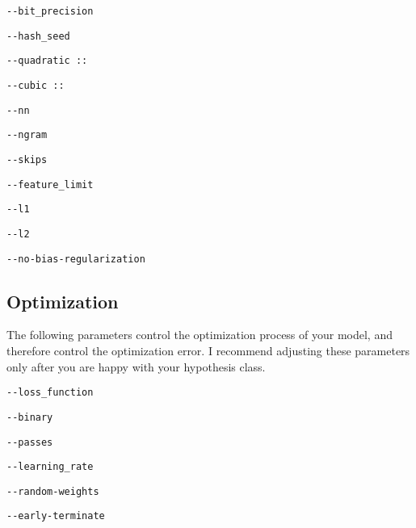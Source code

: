 \documentclass[10pt]{exam}
\theoremstyle{definition}
\begin{document}
    \vspace{1in}
    \lstinline{--bit_precision}

    \vspace{2in}
    \lstinline{--hash_seed}

    \vspace{2in}
    \lstinline{--quadratic ::}

    \vspace{2in}
    \lstinline{--cubic ::}
    
    \vspace{2in}
    \lstinline{--nn}
    
    \vspace{2in}
    \lstinline{--ngram}
    
    \vspace{2in}
    \lstinline{--skips}
    
    \vspace{2in}
    \lstinline{--feature_limit}
    
    \vspace{2in}
    \lstinline{--l1}
    
    \vspace{2in}
    \lstinline{--l2}
    
    \vspace{2in}
    \lstinline{--no-bias-regularization}
    \vspace{1in}

    \newpage
\subsection{Optimization}
    The following parameters control the optimization process of your model,
    and therefore control the optimization error.
    I recommend adjusting these parameters only after you are happy with your hypothesis class.

    \vspace{0.5in}
    \lstinline{--loss_function}

    \vspace{1in}
    \lstinline{--binary}

    \vspace{1in}
    \lstinline{--passes}

    \vspace{1in}
    \lstinline{--learning_rate}

    \vspace{1in}
    \lstinline{--random-weights}

    \vspace{1in}
    \lstinline{--early-terminate}
\end{document}
